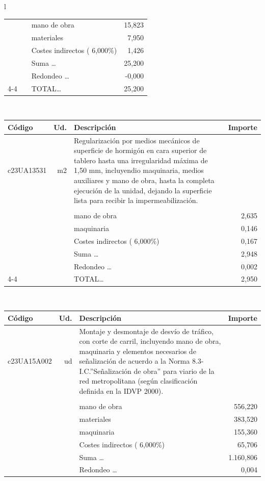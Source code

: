\documentclass{book}%
\begin{document}
\begin{longtable}{l}
\begin{tabular}{l r p{60mm} r}
&&mano de obra&    15,823\\%
&&materiales&     7,950\\%
&&Costes indirectos (     6,000\%)&     1,426\\%
&&Suma \ldots&    25,200\\%
&&Redondeo \ldots&    {-}0,000\\%
\cline{4-4}%
&&TOTAL\ldots&    25,200\\%
\end{tabular}\\%
\begin{tabular}{l r p{60mm} r}%
Código&Ud.&Descripción&Importe\\%
\hline%
c23UA13531&m2&Regularización por medios mecánicos de superficie de hormigón en cara superior de tablero hasta una irregularidad máxima de 1,50 mm, incluyendio maquinaria, medios auxiliares y mano de obra, hasta la completa ejecución de la unidad, dejando la superficie lista para recibir la impermeabilización.&\\%
&&&\\%
&&mano de obra&     2,635\\%
&&maquinaria&     0,146\\%
&&Costes indirectos (     6,000\%)&     0,167\\%
&&Suma \ldots&     2,948\\%
&&Redondeo \ldots&     0,002\\%
\cline{4-4}%
&&TOTAL\ldots&     2,950\\%
\end{tabular}\\%
\begin{tabular}{l r p{60mm} r}%
Código&Ud.&Descripción&Importe\\%
\hline%
c23UA15A002&ud&Montaje y desmontaje de desvío de tráfico, con corte de carril, incluyendo mano de obra, maquinaria y elementos necesarios de señalización de acuerdo a la Norma 8.3{-}I.C.”Señalización de obra” para viario de la red metropolitana (según clasificación definida en la IDVP 2000).&\\%
&&&\\%
&&mano de obra&   556,220\\%
&&materiales&   383,520\\%
&&maquinaria&   155,360\\%
&&Costes indirectos (     6,000\%)&    65,706\\%
&&Suma \ldots& 1.160,806\\%
&&Redondeo \ldots&     0,004\\%

\end{tabular}
\end{longtable}
\end{document}
